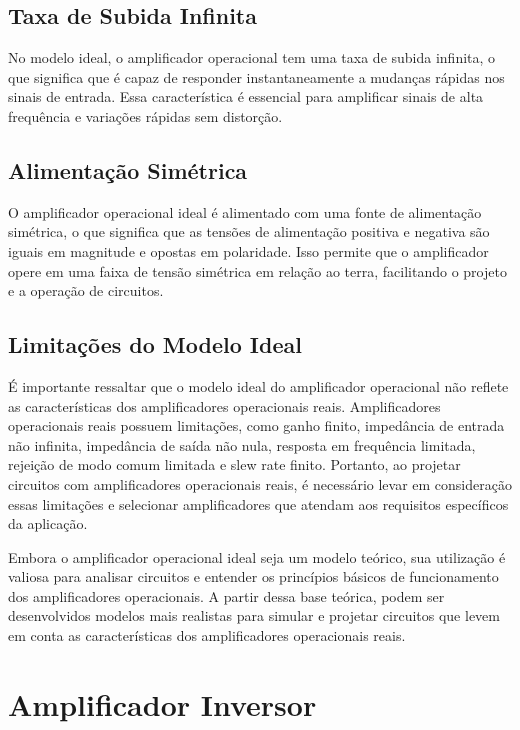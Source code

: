 \documentclass[12pt,twoside, a4paper, twocolumn]{article}
\begin{document}
\subsection{Taxa de Subida Infinita}


No modelo ideal, o amplificador operacional tem uma taxa de subida infinita, o que significa que é capaz de responder instantaneamente a mudanças rápidas nos sinais de entrada. Essa característica é essencial para amplificar sinais de alta frequência e variações rápidas sem distorção.


\subsection{Alimentação Simétrica}


O amplificador operacional ideal é alimentado com uma fonte de alimentação simétrica, o que significa que as tensões de alimentação positiva e negativa são iguais em magnitude e opostas em polaridade. Isso permite que o amplificador opere em uma faixa de tensão simétrica em relação ao terra, facilitando o projeto e a operação de circuitos.


\subsection{Limitações do Modelo Ideal}


É importante ressaltar que o modelo ideal do amplificador operacional não reflete as características dos amplificadores operacionais reais. Amplificadores operacionais reais possuem limitações, como ganho finito, impedância de entrada não infinita, impedância de saída não nula, resposta em frequência limitada, rejeição de modo comum limitada e slew rate finito. Portanto, ao projetar circuitos com amplificadores operacionais reais, é necessário levar em consideração essas limitações e selecionar amplificadores que atendam aos requisitos específicos da aplicação.


Embora o amplificador operacional ideal seja um modelo teórico, sua utilização é valiosa para analisar circuitos e entender os princípios básicos de funcionamento dos amplificadores operacionais. A partir dessa base teórica, podem ser desenvolvidos modelos mais realistas para simular e projetar circuitos que levem em conta as características dos amplificadores operacionais reais.




\newpage


\section{Amplificador Inversor}
\end{document}
